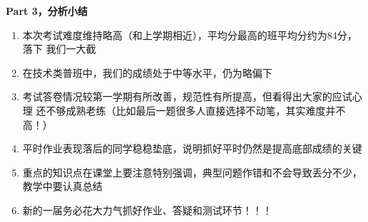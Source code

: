 \bigskip
{\large\bf Part 3，分析小结}

\begin{enumerate}[(1)]
  \setlength{\itemindent}{1cm}
  \item 本次考试难度维持略高（和上学期相近），平均分最高的班平均分约为84分，落下
  我们一大截
  \item 在技术类普班中，我们的成绩处于中等水平，仍为略偏下
  \item 考试答卷情况较第一学期有所改善，规范性有所提高，但看得出大家的应试心理
  还不够成熟老练（比如最后一题很多人直接选择不动笔，其实难度并不高！）
  \item 平时作业表现落后的同学稳稳垫底，说明抓好平时仍然是提高底部成绩的关键
  \item 重点的知识点在课堂上要注意特别强调，典型问题作错和不会导致丢分不少，
  教学中要认真总结
  \item 新的一届务必花大力气抓好作业、答疑和测试环节！！！
\end{enumerate}


